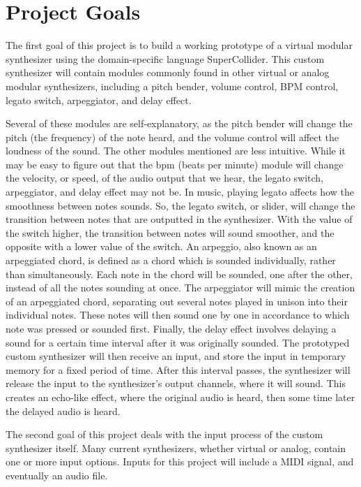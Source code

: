 \section[Project Goals]{Project Goals}
The first goal of this project is to build a working prototype of a virtual modular synthesizer using the domain-specific language SuperCollider. This custom synthesizer will contain modules commonly found in other virtual or analog modular synthesizers, including a pitch bender, volume control, BPM control, legato switch, arpeggiator, and delay effect.

Several of these modules are self-explanatory, as the pitch bender will change the pitch (the frequency) of the note heard, and the volume control will affect the loudness of the sound. The other modules mentioned are less intuitive. While it may be easy to figure out that the bpm (beats per minute) module will change the velocity, or speed, of the audio output that we hear, the legato switch, arpeggiator, and delay effect may not be. In music, playing legato affects how the smoothness between notes sounds. So, the legato switch, or slider, will change the transition between notes that are outputted in the synthesizer. With the value of the switch higher, the transition between notes will sound smoother, and the opposite with a lower value of the switch. An arpeggio, also known as an arpeggiated chord, is defined as a chord which is sounded individually, rather than simultaneously. Each note in the chord will be sounded, one after the other, instead of all the notes sounding at once. The arpeggiator will mimic the creation of an arpeggiated chord, separating out several notes played in unison into their individual notes. These notes will then sound one by one in accordance to which note was pressed or sounded first. Finally, the delay effect involves delaying a sound for a certain time interval after it was originally sounded. The prototyped custom synthesizer will then receive an input, and store the input in temporary memory for a fixed period of time. After this interval passes, the synthesizer will release the input to the synthesizer's output channels, where it will sound. This creates an echo-like effect, where the original audio is heard, then some time later the delayed audio is heard. 

The second goal of this project deals with the input process of the custom synthesizer itself. Many current synthesizers, whether virtual or analog, contain one or more input options. Inputs for this project will include a MIDI signal, and eventually an audio file. 